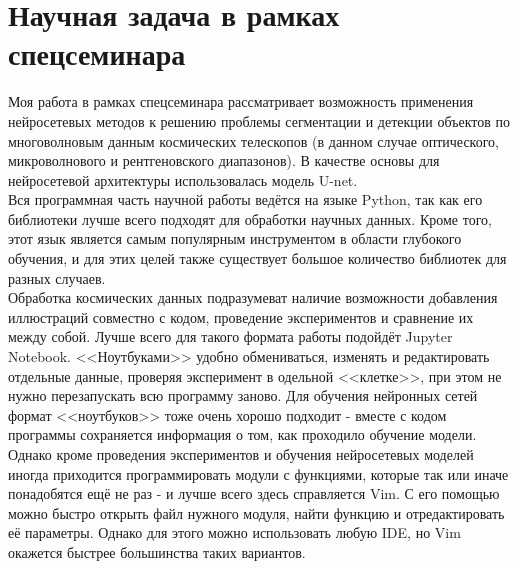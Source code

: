 \chapter{Научная задача в рамках спецсеминара}
\label{cha:ch_3}

Моя работа в рамках спецсеминара рассматривает возможность применения нейросетевых методов к 
решению проблемы сегментации и детекции объектов по многоволновым данным космических телескопов 
(в данном случае оптического, микроволнового и рентгеновского диапазонов). В качестве основы для нейросетевой архитектуры использовалась модель U-net.\\

Вся программная часть научной работы ведётся на языке Python, так как его библиотеки лучше всего 
подходят для обработки научных данных. Кроме того, этот язык является самым популярным инструментом 
в области глубокого обучения, и для этих целей также существует большое количество библиотек для 
разных случаев.\\

Обработка космических данных подразумеват наличие возможности добавления иллюстраций совместно с 
кодом, проведение экспериментов и сравнение их между собой. Лучше всего для такого формата работы 
подойдёт Jupyter Notebook. <<Ноутбуками>> удобно обмениваться, изменять и редактировать отдельные 
данные, проверяя эксперимент в одельной <<клетке>>, при этом не нужно перезапускать всю программу 
заново. Для обучения нейронных сетей формат <<ноутбуков>> тоже очень хорошо подходит - вместе с 
кодом программы сохраняется информация о том, как проходило обучение модели. \\

Однако кроме проведения экспериментов и обучения нейросетевых моделей иногда приходится 
программировать модули с функциями, которые так или иначе понадобятся ещё не раз - и лучше всего 
здесь справляется Vim. С его помощью можно быстро открыть файл нужного модуля, найти функцию и 
отредактировать её параметры. Однако для этого можно использовать любую IDE, но Vim окажется 
быстрее большинства таких вариантов.\\
